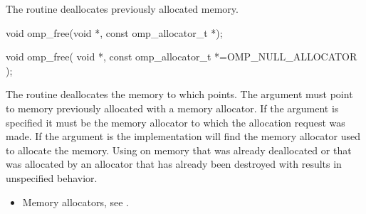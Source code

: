 \begin{ccppspecific}
\summary
The  routine deallocates previously allocated memory.

\format

\begin{cspecific}
\begin{ompcFunction}
void omp_free(void *, const omp_allocator_t *);
\end{ompcFunction}
\end{cspecific}
\begin{cppspecific}
\begin{ompcFunction}
void omp_free(
  void *,
  const omp_allocator_t *=OMP_NULL_ALLOCATOR
);
\end{ompcFunction}
\end{cppspecific}

\effect
The  routine deallocates the memory to which  
points. The  argument must point to memory previously allocated 
with a memory allocator. If the  argument is specified it 
must be the memory allocator to which the allocation request was made. If 
the  argument is  the implementation 
will find the memory allocator used to allocate the memory. Using 
 on memory that was already deallocated or that was 
allocated by an allocator that has already been destroyed with 
 results in unspecified behavior.

\crossreferences
\begin{itemize}
\item Memory allocators, see .
\end{itemize}

\end{ccppspecific}
